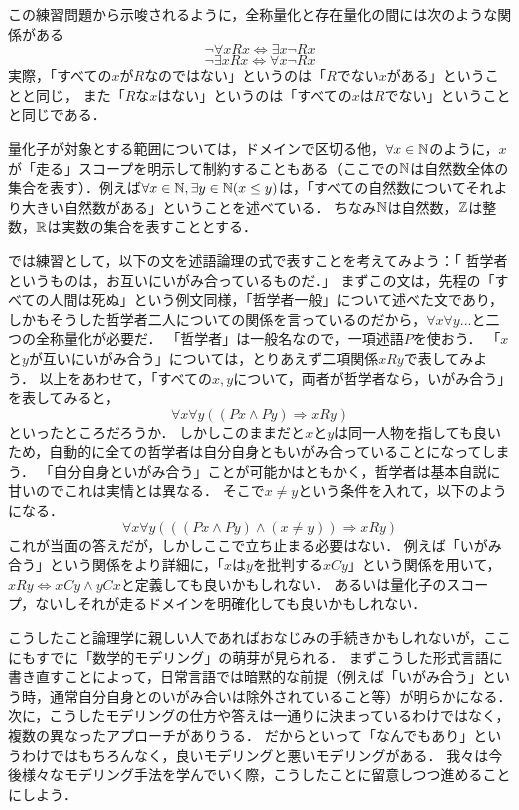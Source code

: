 \documentclass[11pt,a4paper]{jsarticle}
\begin{document}
この練習問題から示唆されるように，全称量化と存在量化の間には次のような関係がある
\[ \neg \forall x Rx \iff \exists x \neg Rx \]
\[ \neg \exists x Rx \iff \forall x \neg Rx \]
実際，「すべての$x$が$R$なのではない」というのは「$R$でない$x$がある」ということと同じ，
また「$R$な$x$はない」というのは「すべての$x$は$R$でない」ということと同じである．

量化子が対象とする範囲については，ドメインで区切る他，$\forall x \in \mathbb{N}$のように，$x$が「走る」スコープを明示して制約することもある（ここでの$\mathbb{N}$は自然数全体の集合を表す）．例えば$\forall x \in \mathbb{N}, \exists y \in \mathbb{N} (x \leq y)$は，「すべての自然数についてそれより大きい自然数がある」ということを述べている．
ちなみ$\mathbb{N}$は自然数，$\mathbb{Z}$は整数，$\mathbb{R}$は実数の集合を表すこととする．

では練習として，以下の文を述語論理の式で表すことを考えてみよう：「 哲学者というものは，お互いにいがみ合っているものだ．」
まずこの文は，先程の「すべての人間は死ぬ」という例文同様，「哲学者一般」について述べた文であり，しかもそうした哲学者二人についての関係を言っているのだから，$\forall x \forall y...$と二つの全称量化が必要だ．
「哲学者」は一般名なので，一項述語$P$を使おう．
「$x$と$y$が互いにいがみ合う」については，とりあえず二項関係$xRy$で表してみよう．
以上をあわせて，「すべての$x, y$について，両者が哲学者なら，いがみ合う」を表してみると，
\begin{equation}
 \forall x \forall y ((Px \wedge Py) \Rightarrow xRy)
\end{equation}
といったところだろうか．
しかしこのままだと$x$と$y$は同一人物を指しても良いため，自動的に全ての哲学者は自分自身ともいがみ合っていることになってしまう．
「自分自身といがみ合う」ことが可能かはともかく，哲学者は基本自説に甘いのでこれは実情とは異なる．
そこで$x \neq y$という条件を入れて，以下のようになる．
\begin{equation}
 \forall x \forall y (((Px \wedge Py) \wedge (x \neq y)) \Rightarrow xRy)
\end{equation}
これが当面の答えだが，しかしここで立ち止まる必要はない．
例えば「いがみ合う」という関係をより詳細に，「$x$は$y$を批判する$xCy$」という関係を用いて，$xRy \Leftrightarrow xCy \wedge yCx$と定義しても良いかもしれない．
あるいは量化子のスコープ，ないしそれが走るドメインを明確化しても良いかもしれない．

こうしたこと論理学に親しい人であればおなじみの手続きかもしれないが，ここにもすでに「数学的モデリング」の萌芽が見られる．
まずこうした形式言語に書き直すことによって，日常言語では暗黙的な前提（例えば「いがみ合う」という時，通常自分自身とのいがみ合いは除外されていること等）が明らかになる．
次に，こうしたモデリングの仕方や答えは一通りに決まっているわけではなく，複数の異なったアプローチがありうる．
だからといって「なんでもあり」というわけではもちろんなく，良いモデリングと悪いモデリングがある．
我々は今後様々なモデリング手法を学んでいく際，こうしたことに留意しつつ進めることにしよう．
\end{document}
